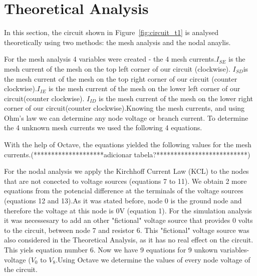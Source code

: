 \section{Theoretical Analysis}
\label{sec:analysis}

In this section, the circuit shown in Figure~\ref{fig:circuit_t1} is analysed
theoretically using two methods: the mesh analysis and the nodal anaylis.\par
For the mesh analysis 4 variables were created - the 4 mesh currents.{\it$I_{SE}$ } is the mesh current of the mesh on the top left corner of our circuit (clockwise). {\it$I_{SD}$}is the mesh current of the mesh on the top right corner of our circuit (counter clockwise).{\it$I_{IE}$ } is the mesh current of the mesh on the lower left corner of our circuit(counter clockwise). {\it$I_{ID}$} is the mesh current of the mesh on the lower right corner of our circuit(counter clockwise).Knowing the mesh currents, and using Ohm's law we can determine any node voltage or branch current. To determine the 4 unknown mesh currents we used the following 4 equations.




With the help of Octave, the equations yielded the following values for the mesh currents.(********************adicionar tabela?**************************)\par

For the nodal analysis we apply the Kirchhoff Current Law (KCL) to the nodes that are not conected to voltage sources (equations 7 to 11). We obtain 2 more equations from the potencial difference at the terminals of the voltage sources (equations 12 and 13).As it was stated before, node 0 is the ground node and therefore the voltage at this node is 0V (equation 1). For the simulation analysis it was necessesary to add an other "fictional" voltage source that provides 0 volts to the circuit, between node 7 and resistor 6. This "fictional" voltage source was also considered in the Theoretical Analysis, as it has no real effect on the circuit. This yiels equation number 6. Now we have 9 equations for 9 unkown variables- voltage ({\it$V_{0}$}  to {\it$V_{8}$}.Using Octave we determine the values of every node voltage of the circuit. \par





